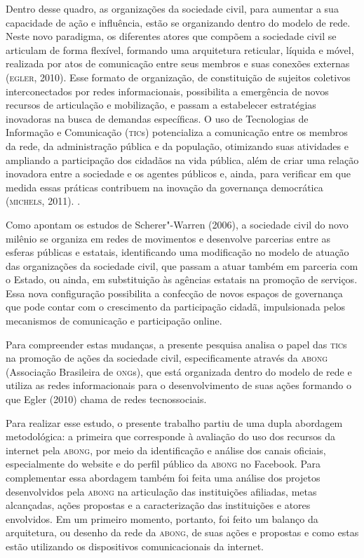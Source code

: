 Dentro desse quadro, as organizações da sociedade civil, para aumentar a
sua capacidade de ação e influência, estão se organizando dentro do
modelo de rede. Neste novo paradigma, os diferentes atores que compõem a
sociedade civil se articulam de forma flexível, formando uma arquitetura
reticular, líquida e móvel, realizada por atos de comunicação entre seus
membros e suas conexões externas (\textsc{egler}, 2010). Esse formato de
organização, de constituição de sujeitos coletivos interconectados por
redes informacionais, possibilita a emergência de novos recursos de
articulação e mobilização, e passam a estabelecer estratégias inovadoras
na busca de demandas específicas. O uso de Tecnologias de Informação e
Comunicação (\textsc{tic}s) potencializa a comunicação entre os membros da rede,
da administração pública e da população, otimizando suas atividades e
ampliando a participação dos cidadãos na vida pública, além de criar uma
relação inovadora entre a sociedade e os agentes públicos e, ainda, para
verificar em que medida essas práticas contribuem na inovação da
governança democrática (\textsc{michels}, 2011). .

Como apontam os estudos de Scherer"-Warren (2006), a sociedade civil do
novo milênio se organiza em redes de movimentos e desenvolve parcerias
entre as esferas públicas e estatais, identificando uma modificação no
modelo de atuação das organizações da sociedade civil, que passam a
atuar também em parceria com o Estado, ou ainda, em substituição às
agências estatais na promoção de serviços. Essa nova configuração
possibilita a confecção de novos espaços de governança que pode contar
com o crescimento da participação cidadã, impulsionada pelos mecanismos
de comunicação e participação online.

Para compreender estas mudanças, a presente pesquisa analisa o papel das
\textsc{tic}s na promoção de ações da sociedade civil, especificamente através da
\textsc{abong} (Associação Brasileira de \textsc{ong}s), que está organizada dentro do
modelo de rede e utiliza as redes informacionais para o desenvolvimento
de suas ações formando o que Egler (2010) chama de redes tecnossociais.

Para realizar esse estudo, o presente trabalho partiu de uma dupla
abordagem metodológica: a primeira que corresponde à avaliação do uso
dos recursos da internet pela \textsc{abong}, por meio da identificação e análise
dos canais oficiais, especialmente do website e do perfil público da
\textsc{abong} no Facebook. Para complementar essa abordagem também foi feita uma
análise dos projetos desenvolvidos pela \textsc{abong} na articulação das
instituições afiliadas, metas alcançadas, ações propostas e a
caracterização das instituições e atores envolvidos. Em um primeiro
momento, portanto, foi feito um balanço da arquitetura, ou desenho da
rede da \textsc{abong}, de suas ações e propostas e como estas estão utilizando
os dispositivos comunicacionais da internet.

